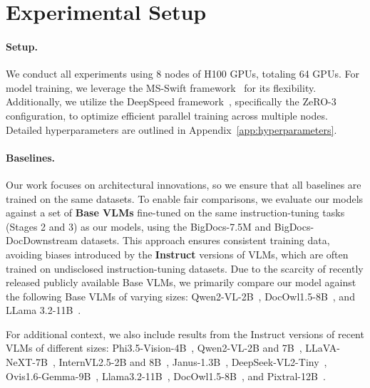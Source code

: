 \vspace{-0.5em}
\section{Experimental Setup}

\vspace{-0.4em}

\paragraph{Setup.} We conduct all experiments using 8 nodes of H100 GPUs, totaling 64 GPUs. For model training, we leverage the MS-Swift framework~\citep{zhao2024swiftascalablelightweightinfrastructure} for its flexibility. Additionally, we utilize the DeepSpeed framework~\citep{aminabadi2022deepspeedinferenceenablingefficient}, specifically the ZeRO-3 configuration, to optimize efficient parallel training across multiple nodes. Detailed hyperparameters are outlined in Appendix~\ref{app:hyperparameters}.

\paragraph{Baselines.} 
Our work focuses on architectural innovations, so we ensure that all baselines are trained on the same datasets.
To enable fair comparisons, we evaluate our models against a set of \textbf{Base VLMs} fine-tuned on the same instruction-tuning tasks (Stages 2 and 3) as our models, using the BigDocs-7.5M and BigDocs-DocDownstream datasets. This approach ensures consistent training data, avoiding biases introduced by the \textbf{Instruct} versions of VLMs, which are often trained on undisclosed instruction-tuning datasets. 
Due to the scarcity of recently released publicly available Base VLMs, we primarily compare our model against the following Base VLMs of varying sizes: Qwen2-VL-2B~\citep{wang2024qwen2vlenhancingvisionlanguagemodels}, DocOwl1.5-8B~\citep{hu2024mplugdocowl15unifiedstructure}, and LLama 3.2-11B~\citep{llama3}.

For additional context, we also include results from the Instruct versions of recent VLMs of different sizes: Phi3.5-Vision-4B~\citep{abdin2024phi3technicalreporthighly}, Qwen2-VL-2B and 7B~\citep{wang2024qwen2vlenhancingvisionlanguagemodels}, LLaVA-NeXT-7B~\citep{liu2024llavanext}, InternVL2.5-2B and 8B~\citep{chen2024internvl}, Janus-1.3B~\citep{wu2024janusdecouplingvisualencoding}, DeepSeek-VL2-Tiny~\citep{wu2024deepseekvl2mixtureofexpertsvisionlanguagemodels}, Ovis1.6-Gemma-9B~\citep{ovis}, Llama3.2-11B~\citep{llama3}, DocOwl1.5-8B~\citep{hu2024mplugdocowl15unifiedstructure}, and Pixtral-12B~\citep{agrawal2024pixtral12b}.

